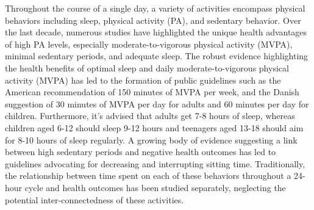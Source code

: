 \documentclass[
  10pt,
  letterpaper,
  DIV=11,
  numbers=noendperiod]{scrartcl}
\begin{document}
Throughout the course of a single day, a variety of activities encompass
physical behaviors including sleep, physical activity (PA), and
sedentary behavior\autocite{rolloWholeDayMatters2020}. Over the last
decade, numerous studies have highlighted the unique health advantages
of high PA levels, especially moderate-to-vigorous physical activity
(MVPA)\autocite{krausPhysicalActivityAllCause2019,leeEffectPhysicalInactivity2012},
minimal sedentary periods\autocite{wilmotSedentaryTimeAdults2012}, and
adequate sleep\autocite{cappuccioSleepDurationAllcause2010}. The robust
evidence highlighting the health benefits of optimal sleep and daily
moderate-to-vigorous physical activity (MVPA) has led to the formation
of public guidelines such as the American recommendation of 150 minutes
of MVPA per week\autocite{klPhysicalActivityGuidelines2018}, and the
Danish suggestion of 30 minutes of MVPA per day for
adults\autocite{el-zineFysiskAktivitetVoksne} and 60 minutes per day for
children\autocite{el-zineFysiskAktivitetBorn}. Furthermore, it's advised
that adults get 7-8 hours of
sleep\autocite{consensusconferencepanelRecommendedAmountSleep2015},
whereas children aged 6-12 should sleep 9-12 hours and teenagers aged
13-18 should aim for 8-10 hours of sleep
regularly\autocite{paruthiConsensusStatementAmerican2016}. A growing
body of evidence suggesting a link between high sedentary periods and
negative health outcomes has led to guidelines advocating for decreasing
and interrupting sitting
time\autocite{tremblaySedentaryBehaviorResearch2017}. Traditionally, the
relationship between time spent on each of these behaviors throughout a
24-hour cycle and health outcomes has been studied separately,
neglecting the potential inter-connectedness of these
activities\autocite{rosenberger24HourActivityCycle2019}.
\end{document}
